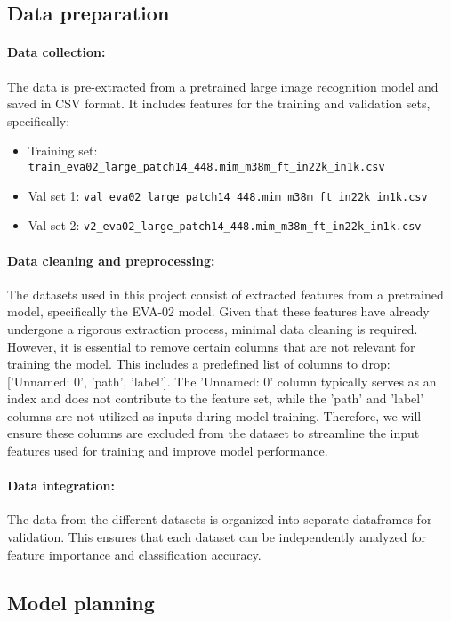 \documentclass[a4paper,11pt]{article}
\begin{document}
\subsection{Data preparation}
\paragraph{Data collection:}  
The data is pre-extracted from a pretrained large image recognition model and saved in CSV format. It includes features for the training and validation sets, specifically:
\begin{itemize}
    \item Training set: \texttt{train\_eva02\_large\_patch14\_448.mim\_m38m\_ft\_in22k\_in1k.csv}
    \item Val set 1: \texttt{val\_eva02\_large\_patch14\_448.mim\_m38m\_ft\_in22k\_in1k.csv}
    \item Val set 2: \texttt{v2\_eva02\_large\_patch14\_448.mim\_m38m\_ft\_in22k\_in1k.csv}
\end{itemize}

\paragraph{Data cleaning and preprocessing:}  
The datasets used in this project consist of extracted features from a pretrained model, specifically the EVA-02 model. Given that these features have already undergone a rigorous extraction process, minimal data cleaning is required. However, it is essential to remove certain columns that are not relevant for training the model. This includes a predefined list of columns to drop: ['Unnamed: 0', 'path', 'label']. The 'Unnamed: 0' column typically serves as an index and does not contribute to the feature set, while the 'path' and 'label' columns are not utilized as inputs during model training. Therefore, we will ensure these columns are excluded from the dataset to streamline the input features used for training and improve model performance.




\paragraph{Data integration:}  
The data from the different datasets is organized into separate dataframes for validation. This ensures that each dataset can be independently analyzed for feature importance and classification accuracy.

\subsection{Model planning}
\end{document}
